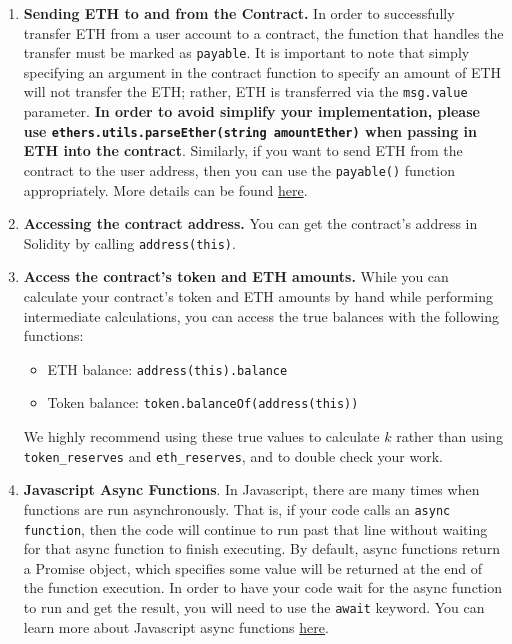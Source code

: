 \documentclass[11pt]{article}
\begin{document}
\begin{enumerate}
    \item \textbf{Sending ETH to and from the Contract.} In order to successfully transfer ETH from a user account to a contract, the function that handles the transfer must be marked as \texttt{payable}. It is important to note that simply specifying an argument in the contract function to specify an amount of ETH will not transfer the ETH; rather, ETH is transferred via the \texttt{msg.value} parameter. \textbf{In order to avoid simplify your implementation, please use \texttt{ethers.utils.parseEther(string amountEther)} when passing in ETH into the contract}. Similarly, if you want to send ETH from the contract to the user address, then you can use the \texttt{payable()} function appropriately. More details can be found \hyperlink{https://solidity-by-example.org/payable/}{here}.
    
    \item \textbf{Accessing the contract address.} You can get the contract's address in Solidity by calling \texttt{address(this)}.
    
    \item \textbf{Access the contract's token and ETH amounts.} While you can calculate your contract's token and ETH amounts by hand while performing intermediate calculations, you can access the true balances with the following functions:
    \begin{itemize}
        \item ETH balance: \texttt{address(this).balance}
        \item Token balance: \texttt{token.balanceOf(address(this))}
    \end{itemize}
    We highly recommend using these true values to calculate $k$ rather than using \texttt{token\_reserves} and \texttt{eth\_reserves}, and to double check your work.
    
    \item \textbf{Javascript Async Functions}. In Javascript, there are many times when functions are run asynchronously. That is, if your code calls an \texttt{async function}, then the code will continue to run past that line without waiting for that async function to finish executing. By default, async functions return a Promise object, which specifies some value will be returned at the end of the function execution. In order to have your code wait for the async function to run and get the result, you will need to use the \texttt{await} keyword. You can learn more about Javascript async functions \hyperlink{https://developer.mozilla.org/en-US/docs/Web/JavaScript/Reference/Statements/async_function}{here}. \\
    

\end{enumerate}
\end{document}
